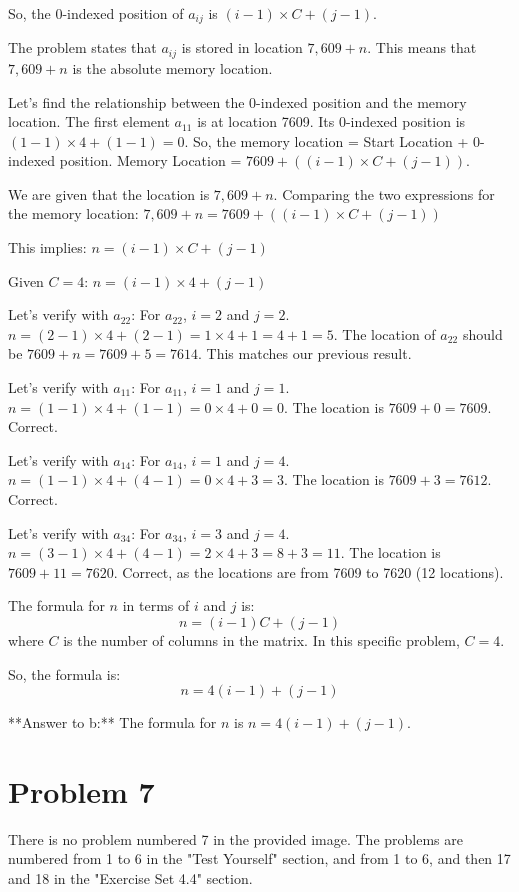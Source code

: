 \documentclass{article}
\begin{document}
So, the 0-indexed position of $a_{ij}$ is $(i-1) \times C + (j-1)$.

The problem states that $a_{ij}$ is stored in location $7,609 + n$.
This means that $7,609 + n$ is the absolute memory location.

Let's find the relationship between the 0-indexed position and the memory location.
The first element $a_{11}$ is at location 7609. Its 0-indexed position is $(1-1) \times 4 + (1-1) = 0$.
So, the memory location = Start Location + 0-indexed position.
Memory Location = $7609 + ((i-1) \times C + (j-1))$.

We are given that the location is $7,609 + n$.
Comparing the two expressions for the memory location:
$7,609 + n = 7609 + ((i-1) \times C + (j-1))$

This implies:
$n = (i-1) \times C + (j-1)$

Given $C=4$:
$n = (i-1) \times 4 + (j-1)$

Let's verify with $a_{22}$:
For $a_{22}$, $i=2$ and $j=2$.
$n = (2-1) \times 4 + (2-1) = 1 \times 4 + 1 = 4 + 1 = 5$.
The location of $a_{22}$ should be $7609 + n = 7609 + 5 = 7614$. This matches our previous result.

Let's verify with $a_{11}$:
For $a_{11}$, $i=1$ and $j=1$.
$n = (1-1) \times 4 + (1-1) = 0 \times 4 + 0 = 0$.
The location is $7609 + 0 = 7609$. Correct.

Let's verify with $a_{14}$:
For $a_{14}$, $i=1$ and $j=4$.
$n = (1-1) \times 4 + (4-1) = 0 \times 4 + 3 = 3$.
The location is $7609 + 3 = 7612$. Correct.

Let's verify with $a_{34}$:
For $a_{34}$, $i=3$ and $j=4$.
$n = (3-1) \times 4 + (4-1) = 2 \times 4 + 3 = 8 + 3 = 11$.
The location is $7609 + 11 = 7620$. Correct, as the locations are from 7609 to 7620 (12 locations).

The formula for $n$ in terms of $i$ and $j$ is:
$$
n = (i-1)C + (j-1)
$$
where $C$ is the number of columns in the matrix.
In this specific problem, $C=4$.

So, the formula is:
$$
n = 4(i-1) + (j-1)
$$

**Answer to b:** The formula for $n$ is $n = 4(i-1) + (j-1)$.

\newpage

\section*{Problem 7}
There is no problem numbered 7 in the provided image. The problems are numbered from 1 to 6 in the "Test Yourself" section, and from 1 to 6, and then 17 and 18 in the "Exercise Set 4.4" section.
\end{document}

